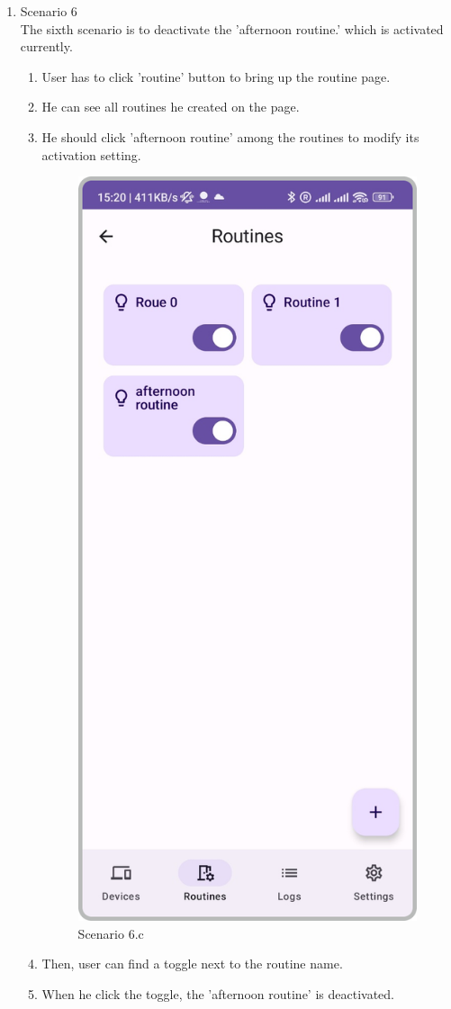 \begin{enumerate}
    \item Scenario 6\\
    The sixth scenario is to deactivate the 'afternoon routine.' which is activated currently.\\
    \begin{enumerate}
        \item User has to click 'routine' button to bring up the routine page.\\
        \item He can see all routines he created on the page.\\
        \item He should click 'afternoon routine' among the routines to modify its activation setting.\\
        \begin{figure}
            \centering
            \includegraphics[width=0.5\linewidth]{imgs/usercase/scenario6-a.png}
            \caption{Scenario 6.c}
            \label{fig:enter-label}
        \end{figure}
        \item Then, user can find a toggle next to the routine name.\\
        \item When he click the toggle, the 'afternoon routine' is deactivated.\\

\end{enumerate}
\end{enumerate}
